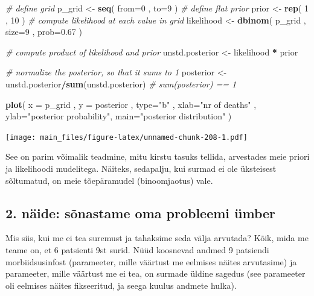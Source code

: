\documentclass[]{book}
\newenvironment{Shaded}{\begin{snugshade}}{\end{snugshade}}
\newcommand{\KeywordTok}[1]{\textcolor[rgb]{0.13,0.29,0.53}{\textbf{#1}}}
\newcommand{\DataTypeTok}[1]{\textcolor[rgb]{0.13,0.29,0.53}{#1}}
\newcommand{\DecValTok}[1]{\textcolor[rgb]{0.00,0.00,0.81}{#1}}
\newcommand{\FloatTok}[1]{\textcolor[rgb]{0.00,0.00,0.81}{#1}}
\newcommand{\StringTok}[1]{\textcolor[rgb]{0.31,0.60,0.02}{#1}}
\newcommand{\CommentTok}[1]{\textcolor[rgb]{0.56,0.35,0.01}{\textit{#1}}}
\newcommand{\OperatorTok}[1]{\textcolor[rgb]{0.81,0.36,0.00}{\textbf{#1}}}
\newcommand{\NormalTok}[1]{#1}
\begin{document}
\begin{Shaded}
\begin{Highlighting}[]
\CommentTok{# define grid}
\NormalTok{p_grid <-}\StringTok{ }\KeywordTok{seq}\NormalTok{( }\DataTypeTok{from=}\DecValTok{0}\NormalTok{ , }\DataTypeTok{to=}\DecValTok{9}\NormalTok{ )}
\CommentTok{# define flat prior}
\NormalTok{prior <-}\StringTok{ }\KeywordTok{rep}\NormalTok{( }\DecValTok{1}\NormalTok{ , }\DecValTok{10}\NormalTok{ )}
\CommentTok{# compute likelihood at each value in grid}
\NormalTok{likelihood <-}\StringTok{ }\KeywordTok{dbinom}\NormalTok{( p_grid , }\DataTypeTok{size=}\DecValTok{9}\NormalTok{ , }\DataTypeTok{prob=}\FloatTok{0.67}\NormalTok{ )}

\CommentTok{# compute product of likelihood and prior}
\NormalTok{unstd.posterior <-}\StringTok{ }\NormalTok{likelihood }\OperatorTok{*}\StringTok{ }\NormalTok{prior }

\CommentTok{# normalize the posterior, so that it sums to 1}
\NormalTok{posterior <-}\StringTok{ }\NormalTok{unstd.posterior}\OperatorTok{/}\KeywordTok{sum}\NormalTok{(unstd.posterior)}
\CommentTok{# sum(posterior) == 1 }

\KeywordTok{plot}\NormalTok{( }\DataTypeTok{x =}\NormalTok{ p_grid , }\DataTypeTok{y =}\NormalTok{ posterior , }\DataTypeTok{type=}\StringTok{"b"}\NormalTok{ ,}
    \DataTypeTok{xlab=}\StringTok{"nr of deaths"}\NormalTok{ , }\DataTypeTok{ylab=}\StringTok{"posterior probability"}\NormalTok{, }\DataTypeTok{main=}\StringTok{"posterior distribution"}\NormalTok{ )}
\end{Highlighting}
\end{Shaded}

\texttt{[image: main\_files/figure-latex/unnamed-chunk-208-1.pdf]}

See on parim võimalik teadmine, mitu kirstu tasuks tellida, arvestades
meie priori ja likelihoodi mudelitega. Näiteks, sedapalju, kui surmad ei
ole üksteisest sõltumatud, on meie tõepäramudel (binoomjaotus) vale.

\subsection{2. näide: sõnastame oma probleemi
ümber}\label{naide-sonastame-oma-probleemi-umber}

Mis siis, kui me ei tea suremust ja tahaksime seda välja arvutada? Kõik,
mida me teame on, et 6 patsienti 9st surid. Nüüd koosnevad andmed 9
patsiendi morbiidsusinfost (parameeter, mille väärtust me eelmises
näites arvutasime) ja parameeter, mille väärtust me ei tea, on surmade
üldine sagedus (see parameeter oli eelmises näites fikseeritud, ja seega
kuulus andmete hulka).
\end{document}
